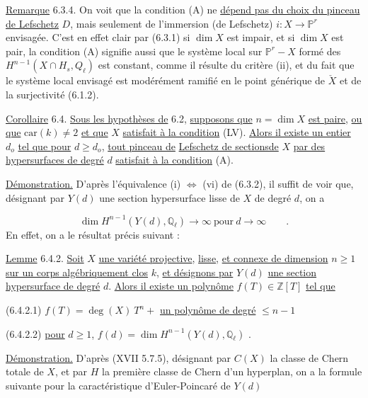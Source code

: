 \underline{Remarque} 6.3.4. On voit que la condition (A) ne \underline{dépend pas du choix du pinceau de Lefschetz} $D$, mais seulement de l'immersion (de Lefschetz) $i : X \longrightarrow \mathbb{P}^r$ envisagée. C'est en effet clair par (6.3.1) si $\dim X$ est impair, et si $\dim X$ est pair, la condition (A) signifie aussi que le système local sur $\mathbb{P}^r - X$ formé des $H^{n-1}(X \cap H_s, Q_\ell)$ est constant, comme il résulte du critère (ii), et du fait que le système local envisagé est modérément ramifié en le point générique de $\check{X}$ et de la surjectivité (6.1.2).

\underline{Corollaire} 6.4.  \underline{Sous les hypothèses de} 6.2, \underline{supposons que} $n = \dim X$ \underline{est paire}, \underline{ou que} $\mathrm{car}(k) \neq 2$ \underline{et que} $X$ \underline{satisfait à la condition} (LV). \underline{Alors il existe un entier} $d_o$ \underline{tel que pour} $d \geq d_o$, \underline{tout pinceau de}
\underline{Lefschetz de sectionsde} $X$ \underline{par des hypersurfaces de degré} $d$ \underline{satisfait à la condition} (A).

\underline{Démonstration.}  D'après l'équivalence (i) $\Longleftrightarrow$ (vi) de (6.3.2), il suffit de voir que, désignant par $Y(d)$ une section hypersurface lisse de $X$ de degré $d$, on a

\begin{equation}\tag{6.4.1}
\dim H^{n-1}(Y(d),\mathbb{Q}_\ell) \longrightarrow \infty \ \mbox{pour} \ d \longrightarrow \infty \qquad .
\end{equation}
En effet, on a le résultat précis suivant :

\underline{Lemme} 6.4.2. \underline{Soit} $X$ \underline{une variété projective}, \underline{lisse}, \underline{et connexe de dimension} $n \geq 1$ \underline{sur un corps algébriquement clos} $k$, \underline{et désignons par} $Y(d)$ \underline{une section hypersurface de degré} $d$. \underline{Alors il existe un polynôme} $f(T) \in \mathbb{Z}[T]$ \underline{tel que}

(6.4.2.1)  $f(T) = \deg(X)\ T^n +$ \underline{un polynôme de degré} $\leq n-1$

(6.4.2.2)  \underline{pour} $d \geq 1$, $f(d) = \dim H^{n-1}(Y(d), \mathbb{Q}_\ell)$ \qquad .

\underline{Démonstration.}  D'après (XVII 5.7.5), désignant par $C(X)$ la classe de Chern totale de $X$, et par $H$ la première classe de Chern d'un hyperplan, on a la formule suivante pour la caractéristique d'Euler-Poincaré de $Y(d)$

